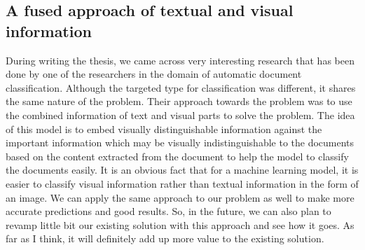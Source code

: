 \subsection{A fused approach of textual and visual information}
During writing the thesis, we came across very interesting research that has been done by one of the researchers in the domain of automatic document classification. Although the targeted type for classification was different, it shares the same nature of the problem. Their approach towards the problem was to use the combined information of text and visual parts to solve the problem. The idea of this model is to embed visually distinguishable information against the important information which may be visually indistinguishable to the documents based on the content extracted from the document to help the model to classify the documents easily. It is an obvious fact that for a machine learning model, it is easier to classify visual information rather than textual information in the form of an image. We can apply the same approach to our problem as well to make more accurate predictions and good results. So, in the future, we can also plan to revamp little bit our existing solution with this approach and see how it goes. As far as I think, it will definitely add up more value to the existing solution.